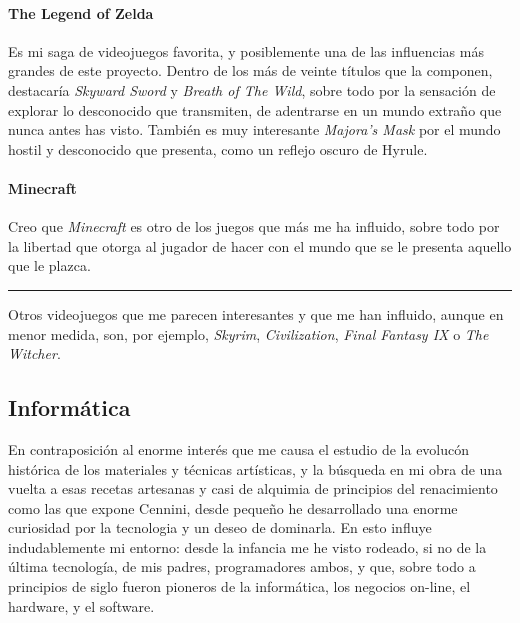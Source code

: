 \documentclass[twoside]{article}
\begin{document}
\begin{multicols}{2}
    \hypertarget{the-legend-of-zelda}{%
    \paragraph{The Legend of Zelda}\label{the-legend-of-zelda}}
    
    Es mi saga de videojuegos favorita, y posiblemente una de las
    influencias más grandes de este proyecto. Dentro de los más de veinte
    títulos que la componen, destacaría \emph{Skyward Sword}\autocite*{miyamoto} y \emph{Breath
    of The Wild}\autocite*{miyamoto2}, sobre todo por la sensación de explorar lo desconocido 
    que
    transmiten, de adentrarse en un mundo extraño que nunca antes has visto.
    También es muy interesante \emph{Majora's Mask}\autocite*{miyamoto3} por el mundo hostil y
    desconocido que presenta, como un reflejo oscuro de Hyrule.
    
    \hypertarget{minecraft}{%
    \paragraph{Minecraft}\label{minecraft}}
    
    Creo que \emph{Minecraft}\autocite*{persson} es otro de los juegos que más me ha influido,
    sobre todo por la libertad que otorga al jugador de hacer con el mundo
    que se le presenta aquello que le plazca.
    
    \begin{center}\rule{0.5\linewidth}{0.5pt}\end{center}
    
    Otros videojuegos que me parecen interesantes y que me han influido,
    aunque en menor medida, son, por ejemplo, \emph{Skyrim},
    \emph{Civilization}\autocite*{meier}, \emph{Final Fantasy IX} o \emph{The Witcher}.
    
    \hypertarget{informuxe1tica}{%
    \subsection{Informática}\label{informuxe1tica}}
    
    En contraposición al enorme interés que me causa el estudio de la evolucón histórica de 
    los materiales y técnicas artísticas, y la búsqueda en mi obra de una vuelta a esas 
    recetas artesanas y casi de alquimia de principios del renacimiento como las que expone 
    Cennini, desde pequeño he desarrollado una enorme curiosidad por la tecnologia y un deseo 
    de dominarla. En esto influye indudablemente mi entorno: desde la infancia me he visto 
    rodeado, si no de la última tecnología, de mis padres, programadores ambos, y que, sobre 
    todo a principios de siglo fueron pioneros de la informática, los negocios on-line, el 
    hardware, y el software.
    

\end{multicols}
\end{document}
